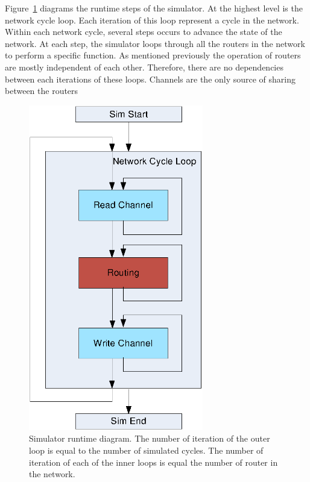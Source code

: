 Figure~\ref{fig:runtime} diagrams the runtime steps of the simulator. At the highest level is the network cycle loop. Each iteration of this loop represent a cycle in the network. Within each network cycle, several steps occurs to advance the state of the network. At each step, the simulator loops through all the routers in the network to perform a specific function. As mentioned previously the operation of routers are mostly independent of each other. Therefore, there are no dependencies between each iterations of these loops. Channels are the only source of sharing between the routers 
\begin{figure}[h]
\centering
\includegraphics[width=3in]{runtime.eps}
\caption{Simulator runtime diagram. The number of iteration of the outer loop is equal to the number of simulated cycles. The number of iteration of each of the inner loops is equal the number of router in the network.}
\label{fig:runtime}
\end{figure}
